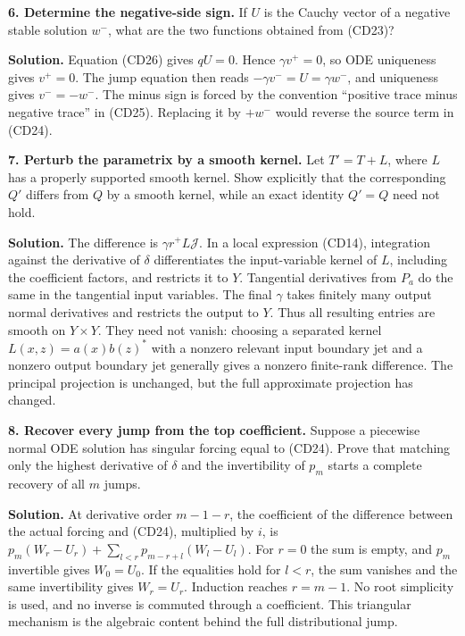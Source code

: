 \documentclass[
  11pt,
]{article}
\begin{document}
\textbf{6. Determine the negative-side sign.} If \(U\) is the Cauchy
vector of a negative stable solution \(w^-\), what are the two functions
obtained from (CD23)?

\textbf{Solution.} Equation (CD26) gives \(qU=0\). Hence
\(\gamma v^+=0\), so ODE uniqueness gives \(v^+=0\). The jump equation
then reads \(-\gamma v^-=U=\gamma w^-\), and uniqueness gives
\(v^-=-w^-\). The minus sign is forced by the convention ``positive
trace minus negative trace'' in (CD25). Replacing it by \(+w^-\) would
reverse the source term in (CD24).

\textbf{7. Perturb the parametrix by a smooth kernel.} Let \(T'=T+L\),
where \(L\) has a properly supported smooth kernel. Show explicitly that
the corresponding \(Q'\) differs from \(Q\) by a smooth kernel, while an
exact identity \(Q'=Q\) need not hold.

\textbf{Solution.} The difference is \(\gamma r^+L\mathcal J\). In a
local expression (CD14), integration against the derivative of
\(\delta\) differentiates the input-variable kernel of \(L\), including
the coefficient factors, and restricts it to \(Y\). Tangential
derivatives from \(P_a\) do the same in the tangential input variables.
The final \(\gamma\) takes finitely many output normal derivatives and
restricts the output to \(Y\). Thus all resulting entries are smooth on
\(Y\times Y\). They need not vanish: choosing a separated kernel
\(L(x,z)=a(x)b(z)^*\) with a nonzero relevant input boundary jet and a
nonzero output boundary jet generally gives a nonzero finite-rank
difference. The principal projection is unchanged, but the full
approximate projection has changed.

\textbf{8. Recover every jump from the top coefficient.} Suppose a
piecewise normal ODE solution has singular forcing equal to (CD24).
Prove that matching only the highest derivative of \(\delta\) and the
invertibility of \(p_m\) starts a complete recovery of all \(m\) jumps.

\textbf{Solution.} At derivative order \(m-1-r\), the coefficient of the
difference between the actual forcing and (CD24), multiplied by \(i\),
is \(p_m(W_r-U_r)+\sum_{l<r}p_{m-r+l}(W_l-U_l)\). For \(r=0\) the sum is
empty, and \(p_m\) invertible gives \(W_0=U_0\). If the equalities hold
for \(l<r\), the sum vanishes and the same invertibility gives
\(W_r=U_r\). Induction reaches \(r=m-1\). No root simplicity is used,
and no inverse is commuted through a coefficient. This triangular
mechanism is the algebraic content behind the full distributional jump.
\end{document}
